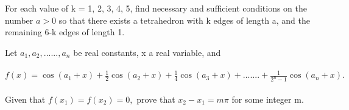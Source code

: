 \item For each value of k = 1, 2, 3, 4, 5, find necessary and sufficient conditions on the number $a > 0$ so that there exists a tetrahedron with k edges of length a, and the remaining 6-k edges of length 1.\\
\item Let $a_1, a_2,......, a_n$ be real constants, x a real variable, and\\
\\$f(x) = \cos(a_1 + x) + \frac{1}{2}\cos(a_2 + x) + \frac{1}{4}\cos(a_3 + x) +.......+\frac{1}{2^{n} - 1}\cos(a_n + x).$\\
\\Given that $f(x_1) = f(x_2) = 0,$ prove that $x_2 -  x_1 = m\pi$ for some integer m.

